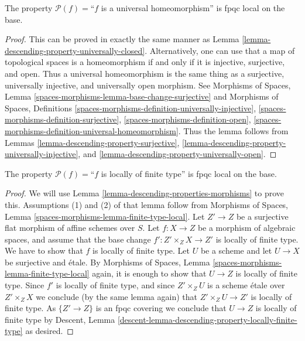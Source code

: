 \begin{lemma}
\label{lemma-descending-property-universal-homeomorphism}
The property $\mathcal{P}(f) =$``$f$ is a universal homeomorphism''
is fpqc local on the base.
\end{lemma}

\begin{proof}
This can be proved in exactly the same manner as
Lemma \ref{lemma-descending-property-universally-closed}.
Alternatively, one can use that a map of topological spaces is a
homeomorphism if and only if it is injective, surjective, and open.
Thus a universal homeomorphism is the same thing as a
surjective, universally injective, and universally open morphism.
See Morphisms of Spaces, Lemma
\ref{spaces-morphisms-lemma-base-change-surjective} and
Morphisms of Spaces, Definitions
\ref{spaces-morphisms-definition-universally-injective},
\ref{spaces-morphisms-definition-surjective},
\ref{spaces-morphisms-definition-open},
\ref{spaces-morphisms-definition-universal-homeomorphism}.
Thus the lemma follows from
Lemmas \ref{lemma-descending-property-surjective},
\ref{lemma-descending-property-universally-injective}, and
\ref{lemma-descending-property-universally-open}.
\end{proof}

\begin{lemma}
\label{lemma-descending-property-locally-finite-type}
The property $\mathcal{P}(f) =$``$f$ is locally of finite type''
is fpqc local on the base.
\end{lemma}

\begin{proof}
We will use
Lemma \ref{lemma-descending-properties-morphisms}
to prove this. Assumptions (1) and (2) of that lemma follow from
Morphisms of Spaces,
Lemma \ref{spaces-morphisms-lemma-finite-type-local}.
Let $Z' \to Z$ be a surjective flat morphism of affine schemes over $S$.
Let $f : X \to Z$ be a morphism of algebraic spaces, and assume
that the base change $f' : Z' \times_Z X \to Z'$ is locally of finite type.
We have to show that $f$ is locally of finite type. Let $U$ be a scheme
and let $U \to X$ be surjective and \'etale. By
Morphisms of Spaces,
Lemma \ref{spaces-morphisms-lemma-finite-type-local}
again, it is enough to show that $U \to Z$ is locally of finite type.
Since $f'$ is locally of finite type, and since $Z' \times_Z U$ is a
scheme \'etale over $Z' \times_Z X$ we conclude (by the same lemma again) that
$Z' \times_Z U \to Z'$ is locally of finite type.
As $\{Z' \to Z\}$ is an fpqc covering we conclude that
$U \to Z$ is locally of finite type by
Descent, Lemma \ref{descent-lemma-descending-property-locally-finite-type}
as desired.
\end{proof}

